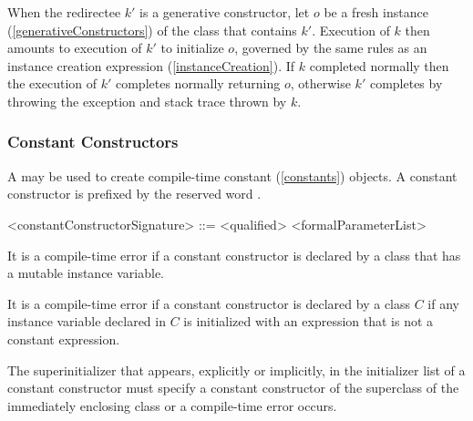 \documentclass[makeidx]{article}
\begin{document}
\LMHash{}%
When the redirectee $k'$ is a generative constructor,
let $o$ be a fresh instance (\ref{generativeConstructors})
of the class that contains $k'$.
Execution of $k$ then amounts to execution of $k'$ to initialize $o$,
governed by the same rules as an instance creation expression (\ref{instanceCreation}).
If $k$ completed normally then the execution of $k'$ completes normally returning $o$,
otherwise $k'$ completes by throwing the exception and stack trace thrown by $k$.


\subsubsection{Constant Constructors}

\LMHash{}%
A 
may be used to create compile-time constant (\ref{constants}) objects.
A constant constructor is prefixed by the reserved word \CONST{}.

\begin{grammar}
<constantConstructorSignature> ::= \CONST{} <qualified> <formalParameterList>
\end{grammar}



\LMHash{}%
It is a compile-time error if a constant constructor is declared by a class that has a mutable instance variable.


\LMHash{}%
It is a compile-time error if a constant constructor is declared by a class $C$ if any instance variable declared in $C$ is initialized with an expression that is not a constant expression.


\LMHash{}%
The superinitializer that appears, explicitly or implicitly, in the initializer list of a constant constructor must specify a constant constructor of the superclass of the immediately enclosing class or a compile-time error occurs.
\end{document}
